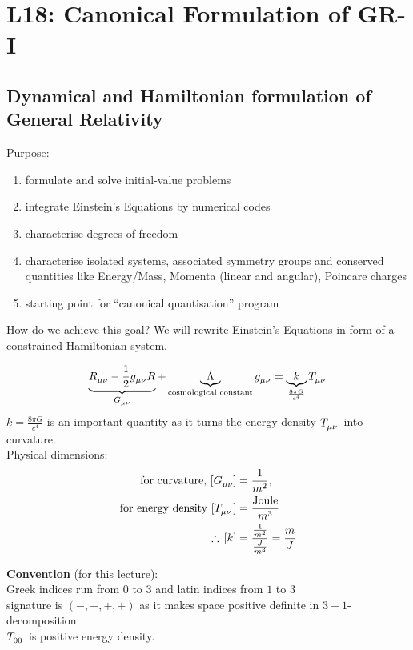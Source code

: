 \section{L18: Canonical Formulation of GR-I}

\subsection{Dynamical and Hamiltonian formulation of General Relativity}
Purpose:
\begin{enumerate}[1)]
\item formulate and solve initial-value problems
\item integrate Einstein's Equations by numerical codes
\item characterise degrees of freedom
\item characterise isolated systems, associated symmetry groups and conserved quantities like Energy/Mass, Momenta (linear and angular), Poincare charges
\item starting point for ``canonical quantisation'' program
\end{enumerate}

How do we achieve this goal? We will rewrite Einstein's Equations in form of a constrained Hamiltonian system.

\[
\underbrace{R\indices{_{\mu\nu}} - \frac{1}{2} g\indices{_{\mu\nu}}R}_{G\indices{_{\mu\nu}}} + \underbrace{\Lambda}_{\text{cosmological constant}} g\indices{_{\mu\nu}} = \underbrace{k}_{\frac{8 \pi G}{c^4}} T\indices{_{\mu\nu}}
\]
$k = \frac{8 \pi G}{c^4}$ is an important quantity as it turns the energy density $T\indices{_{\mu\nu}}$ into curvature. \\
Physical dimensions: \\
\begin{align*}
\text{for curvature, } [G\indices{_{\mu\nu}}] & = \frac{1}{m^2}, \\
\text{for energy density } [T\indices{_{\mu\nu}}] & = \frac{\text{Joule}}{m^3} \\
\therefore \, [k] & = \frac{\frac{1}{m^2}}{\frac{J}{m^3}} = \frac{m}{J}
\end{align*}
 
\begin{framed}
\textbf{Convention} (for this lecture): \\
Greek indices run from $0$ to $3$ and latin indices from $1$ to $3$ \\
signature is $(-,+,+,+)$ as it makes space positive definite in $3+1$-decomposition\\
$T\indices{_{00}}$ is positive energy density. \\
\end{framed}
